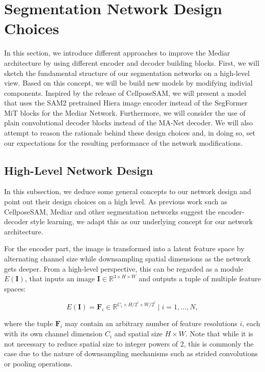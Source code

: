 \section{Segmentation Network Design Choices}

In this section, we introduce different approaches to improve the Mediar architecture by using different encoder and decoder building blocks. First, we will sketch the fundamental structure of our segmentation networks on a high-level view. Based on this concept, we will be build new models by modifying indivial components. Inspired by the release of CellposeSAM, we will present a model that uses the SAM2 pretrained Hiera image encoder instead of the SegFormer MiT blocks for the Mediar Network. Furthermore, we will consider the use of plain convolutional decoder blocks instead of the MA-Net decoder. We will also attempt to reason the rationale behind these design choices and, in doing so, set our expectations for the resulting performance of the network modifications.

\subsection{High-Level Network Design}

In this subsection, we deduce some general concepts to our network design and point out their design choices on a high level. As previous work such as CellposeSAM, Mediar and other segmentation networks suggest the encoder-decoder style learning, we adapt this as our underlying concept for our network architecture. 

For the encoder part, the image is transformed into a latent feature space by alternating channel size while downsampling spatial dimensions as the network gets deeper. From a high-level perspective, this can be regarded as a module $E(\mathbf{I})$, that inputs an image $\mathbf{I} \in \mathbb{R}^{3 \times H \times W}$ and outputs a tuple of multiple feature spaces:

\begin{equation}
E(\mathbf{I}) =
{\mathbf{F}_i \in \mathbb{R}^{C_i \times H/{2^i} \times W/{2^i}} \mid i = 1, \dots, N },
\end{equation}

where the tuple $\mathbf{F}_i$ may contain an arbitrary number of feature resolutions $i$, each with its own channel dimension $C_i$ and spatial size $H \times W$. Note that while it is not necessary to reduce spatial size to integer powers of 2, this is commonly the case due to the nature of downsampling mechanisms such as strided convolutions or pooling operations.

